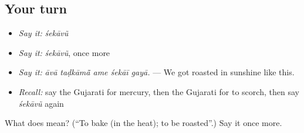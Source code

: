 \subsection*{Your turn}
\begin{itemize}
\raggedright
  \item \emph{Say it:} \emph{śekāvũ}
  \item \emph{Say it:} \emph{śekāvũ}, once more
  \item \emph{Say it:} \emph{āvā taḍkāmā̃ ame śekāī gayā.} — We got roasted in sunshine like this.
  \item \emph{Recall:} say the Gujarati for mercury, then the Gujarati for to scorch, then say \emph{śekāvũ} again
\end{itemize}

\begin{tcolorbox}[breakable,colback=teal!4,colframe=teal!35!black,title={Before you move on}]
What does  mean? (\textquotedblleft{}To bake (in the heat); to be roasted\textquotedblright{}.) Say it once more.
\end{tcolorbox}

